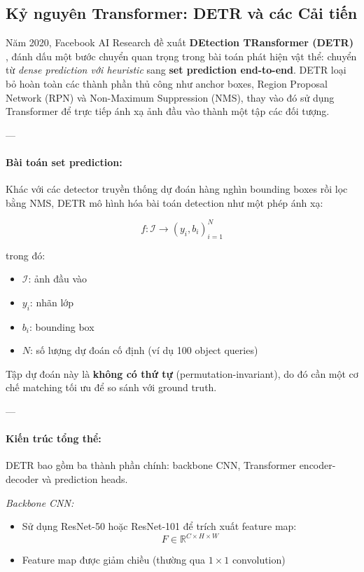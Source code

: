 \subsection{Kỷ nguyên Transformer: DETR và các Cải tiến}
\label{subsec:transformer_based_detectors}

Năm 2020, Facebook AI Research đề xuất \textbf{DEtection TRansformer (DETR)} \cite{Carion2020}, đánh dấu một bước chuyển quan trọng trong bài toán phát hiện vật thể: chuyển từ \textit{dense prediction với heuristic} sang \textbf{set prediction end-to-end}. DETR loại bỏ hoàn toàn các thành phần thủ công như anchor boxes, Region Proposal Network (RPN) và Non-Maximum Suppression (NMS), thay vào đó sử dụng Transformer để trực tiếp ánh xạ ảnh đầu vào thành một tập các đối tượng.

---

\paragraph{Bài toán set prediction:}

Khác với các detector truyền thống dự đoán hàng nghìn bounding boxes rồi lọc bằng NMS, DETR mô hình hóa bài toán detection như một phép ánh xạ:

\begin{equation}
	f: \mathcal{I} \rightarrow {(y_i, b_i)}_{i=1}^{N}
\end{equation}

trong đó:
\begin{itemize}
	\item $\mathcal{I}$: ảnh đầu vào
	\item $y_i$: nhãn lớp
	\item $b_i$: bounding box
	\item $N$: số lượng dự đoán cố định (ví dụ 100 object queries)
\end{itemize}

Tập dự đoán này là \textbf{không có thứ tự} (permutation-invariant), do đó cần một cơ chế matching tối ưu để so sánh với ground truth.

---

\paragraph{Kiến trúc tổng thể:}

DETR bao gồm ba thành phần chính: backbone CNN, Transformer encoder-decoder và prediction heads.

\textit{Backbone CNN:}
\begin{itemize}
	\item Sử dụng ResNet-50 hoặc ResNet-101 để trích xuất feature map:
	\[
	F \in \mathbb{R}^{C \times H \times W}
	\]
	\item Feature map được giảm chiều (thường qua $1 \times 1$ convolution)
\end{itemize}

